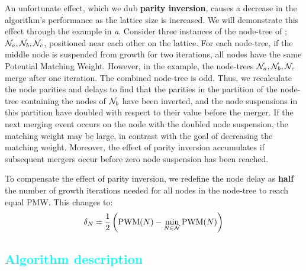 An unfortunate effect, which we dub \textbf{parity inversion}, causes a decrease in the algorithm's performance as the lattice size is increased. We will demonstrate this effect through the example in \emph{a}. Consider three instances of the node-tree of ; $\mathcal{N}_a, \mathcal{N}_b, \mathcal{N}_c$, positioned near each other on the lattice. For each node-tree, if the middle node is suspended from growth for two iterations, all nodes have the same Potential Matching Weight. However, in the example, the node-trees $\mathcal{N}_a, \mathcal{N}_b, \mathcal{N}_c$ merge after one iteration. The combined node-tree is odd. Thus, we recalculate the node parities and delays to find that the parities in the partition of the node-tree containing the nodes of $\mathcal{N}_b$ have been inverted, and the node suspensions in this partition have doubled with respect to their value before the merger. If the next merging event occurs on the node with the doubled node suspension, the matching weight may be large, in contrast with the goal of decreasing the matching weight. Moreover, the effect of parity inversion accumulates if subsequent mergers occur before zero node suspension has been reached. %

To compensate the effect of parity inversion, we redefine the node delay as \textbf{half} the number of growth iterations needed for all nodes in the node-tree to reach equal PMW. This changes  to:
\begin{equation}\label{eq:pmwdifnew}
  \delta_N = \frac{1}{2}\left(\text{PWM}(N) - \min_{N\in\mathcal{N}}{\text{PWM}(N) }\right)
\end{equation}

\subsection{\textcolor{cyan}{Algorithm description}}\label{sec:pseudocode}

